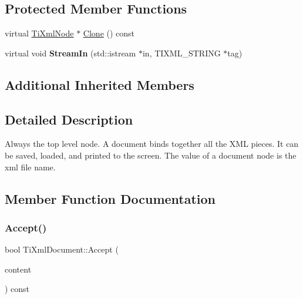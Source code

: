 \subsection*{Protected Member Functions}
\begin{DoxyCompactItemize}
\item 
virtual \hyperlink{class_ti_xml_node}{Ti\+Xml\+Node} $\ast$ \hyperlink{class_ti_xml_document_a46a4dda6c56eb106d46d4046ae1e5353}{Clone} () const
\item 
\mbox{\label{class_ti_xml_document_aceaada9ac29206fb660e0449c92b1295}} 
virtual void {\bfseries Stream\+In} (std\+::istream $\ast$in, T\+I\+X\+M\+L\+\_\+\+S\+T\+R\+I\+NG $\ast$tag)
\end{DoxyCompactItemize}
\subsection*{Additional Inherited Members}


\subsection{Detailed Description}
Always the top level node. A document binds together all the X\+ML pieces. It can be saved, loaded, and printed to the screen. The \textquotesingle{}value\textquotesingle{} of a document node is the xml file name. 

\subsection{Member Function Documentation}
\mbox{\label{class_ti_xml_document_a8ddd6eec722cbd25900bbac664909bac}} 
\subsubsection{\texorpdfstring{Accept()}{Accept()}}
{\footnotesize\ttfamily bool Ti\+Xml\+Document\+::\+Accept (\begin{DoxyParamCaption}\item[{\hyperlink{class_ti_xml_visitor}{Ti\+Xml\+Visitor} $\ast$}]{content }\end{DoxyParamCaption}) const\hspace{0.3cm}{\ttfamily [virtual]}}


